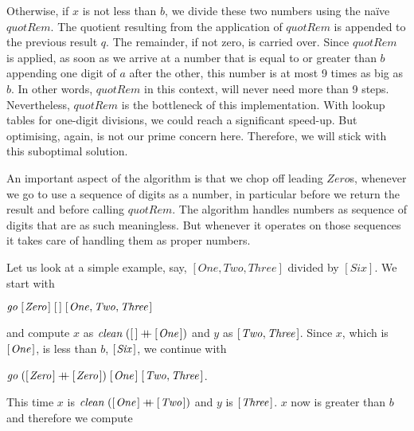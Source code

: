 \documentclass{scrreprt}
\newcommand{\Conid}[1]{\mathit{#1}}
\newcommand{\Varid}[1]{\mathit{#1}}
\newcommand{\plus}{\mathbin{+\!\!\!+}}
\begin{document}
Otherwise, if $x$ is not less than $b$,
we divide these two numbers using 
the na\"ive \ensuremath{\Varid{quotRem}}.
The quotient resulting from the application
of \ensuremath{\Varid{quotRem}} is appended to the previous result $q$.
The remainder, if not zero, is carried over.
Since \ensuremath{\Varid{quotRem}} is applied, as soon as we arrive
at a number that is equal to or greater than $b$
appending one digit of $a$ after the other,
this number is at most 9 times as big as $b$.
In other words, \ensuremath{\Varid{quotRem}} in this context,
will never need more than 9 steps.
Nevertheless, \ensuremath{\Varid{quotRem}} is the bottleneck
of this implementation.
With lookup tables for one-digit divisions,
we could reach a significant speed-up.
But optimising, again, is not our prime
concern here. Therefore, we will stick with
this suboptimal solution.

An important aspect of the algorithm is 
that we chop off leading \ensuremath{\Conid{Zero}}s, whenever we go to use
a sequence of digits as a number,
in particular before we return the result
and before calling \ensuremath{\Varid{quotRem}}.
The algorithm handles numbers as sequence of digits
that are as such meaningless.
But whenever it operates on those sequences 
it takes care of handling them as proper numbers.

Let us look at a simple example, say, 
$[One,Two,Three]$ divided by $[Six]$.
We start with

\ensuremath{\Varid{go}\;[\mskip1.5mu \Conid{Zero}\mskip1.5mu]\;[\mskip1.5mu \mskip1.5mu]\;[\mskip1.5mu \Conid{One},\Conid{Two},\Conid{Three}\mskip1.5mu]}

and compute $x$ as \ensuremath{\Varid{clean}\;([\mskip1.5mu \mskip1.5mu]\plus [\mskip1.5mu \Conid{One}\mskip1.5mu])}
and $y$ as \ensuremath{[\mskip1.5mu \Conid{Two},\Conid{Three}\mskip1.5mu]}.
Since $x$, which is \ensuremath{[\mskip1.5mu \Conid{One}\mskip1.5mu]}, is less than $b$,
\ensuremath{[\mskip1.5mu \Conid{Six}\mskip1.5mu]}, we continue with

\ensuremath{\Varid{go}\;([\mskip1.5mu \Conid{Zero}\mskip1.5mu]\plus [\mskip1.5mu \Conid{Zero}\mskip1.5mu])\;[\mskip1.5mu \Conid{One}\mskip1.5mu]\;[\mskip1.5mu \Conid{Two},\Conid{Three}\mskip1.5mu]}.

This time $x$ is \ensuremath{\Varid{clean}\;([\mskip1.5mu \Conid{One}\mskip1.5mu]\plus [\mskip1.5mu \Conid{Two}\mskip1.5mu])} and
$y$ is \ensuremath{[\mskip1.5mu \Conid{Three}\mskip1.5mu]}.
$x$ now is greater than $b$ and therefore we compute
\end{document}
